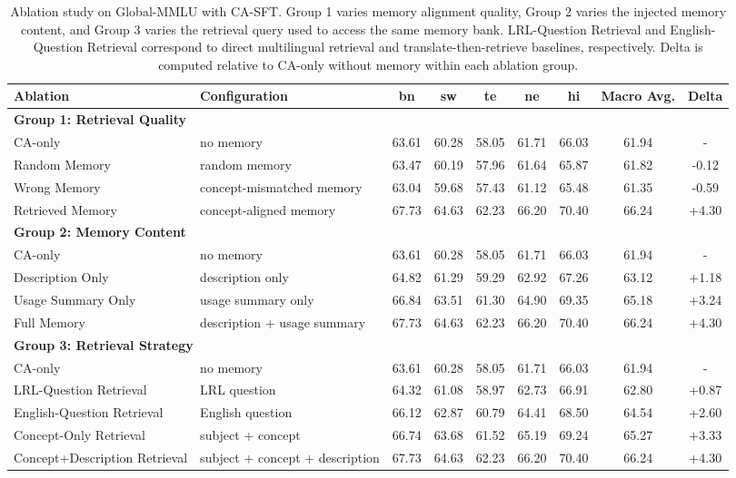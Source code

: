 \documentclass[11pt]{article}
\begin{document}
\begin{table}[t]
\centering
\small
\setlength{\tabcolsep}{3.2pt}
\renewcommand{\arraystretch}{1.02}
\begin{tabular*}{\textwidth}{@{\extracolsep{\fill}} l l c c c c c c c}
\hline
Ablation & Configuration & bn & sw & te & ne & hi & Macro Avg. & Delta \\
\hline
\multicolumn{9}{l}{\textbf{Group 1: Retrieval Quality}} \\
CA-only & no memory & 63.61 & 60.28 & 58.05 & 61.71 & 66.03 & 61.94 & - \\
Random Memory & random memory & 63.47 & 60.19 & 57.96 & 61.64 & 65.87 & 61.82 & -0.12 \\
Wrong Memory & concept-mismatched memory & 63.04 & 59.68 & 57.43 & 61.12 & 65.48 & 61.35 & -0.59 \\
Retrieved Memory & concept-aligned memory & 67.73 & 64.63 & 62.23 & 66.20 & 70.40 & 66.24 & +4.30 \\
\hline
\multicolumn{9}{l}{\textbf{Group 2: Memory Content}} \\
CA-only & no memory & 63.61 & 60.28 & 58.05 & 61.71 & 66.03 & 61.94 & - \\
Description Only & description only & 64.82 & 61.29 & 59.29 & 62.92 & 67.26 & 63.12 & +1.18 \\
Usage Summary Only & usage summary only & 66.84 & 63.51 & 61.30 & 64.90 & 69.35 & 65.18 & +3.24 \\
Full Memory & description + usage summary & 67.73 & 64.63 & 62.23 & 66.20 & 70.40 & 66.24 & +4.30 \\
\hline
\multicolumn{9}{l}{\textbf{Group 3: Retrieval Strategy}} \\
CA-only & no memory & 63.61 & 60.28 & 58.05 & 61.71 & 66.03 & 61.94 & - \\
LRL-Question Retrieval & LRL question & 64.32 & 61.08 & 58.97 & 62.73 & 66.91 & 62.80 & +0.87 \\
English-Question Retrieval & English question & 66.12 & 62.87 & 60.79 & 64.41 & 68.50 & 64.54 & +2.60 \\
Concept-Only Retrieval & subject + concept & 66.74 & 63.68 & 61.52 & 65.19 & 69.24 & 65.27 & +3.33 \\
Concept+Description Retrieval & subject + concept + description & 67.73 & 64.63 & 62.23 & 66.20 & 70.40 & 66.24 & +4.30 \\
\hline
\end{tabular*}
\caption{Ablation study on Global-MMLU with CA-SFT. Group 1 varies memory alignment quality, Group 2 varies the injected memory content, and Group 3 varies the retrieval query used to access the same memory bank. LRL-Question Retrieval and English-Question Retrieval correspond to direct multilingual retrieval and translate-then-retrieve baselines, respectively. Delta is computed relative to CA-only without memory within each ablation group.}
\label{tab:ablation_main}
\end{table}
\end{document}
